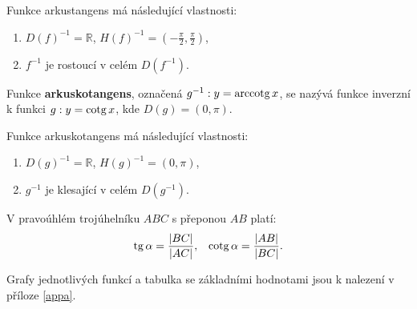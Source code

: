 \begin{pozn}
Funkce arkustangens má následující vlastnosti:
\begin{enumerate}
\item $D(f)^{-1} = \mathbb{R}$, $H(f)^{-1} = \left ( -\frac{\pi}{2}, \frac{\pi}{2} \right )$,
\item $f^{-1}$ je rostoucí v celém $D(f^{-1})$.
\end{enumerate}
\end{pozn}

\begin{definition}
  Funkce \textbf{arkuskotangens}, označená $g^{-1}: y=\operatorname{arccotg} x$, se nazývá funkce inverzní k funkci $g: y=\operatorname{cotg} x$, kde $D(g)=\left ( 0, \pi \right )$.
\end{definition}

\begin{pozn}
Funkce arkuskotangens má následující vlastnosti:
\begin{enumerate}
\item $D(g)^{-1} = \mathbb{R}$, $H(g)^{-1} = \left ( 0, \pi \right )$,
\item $g^{-1}$ je klesající v celém $D(g^{-1})$.
\end{enumerate}
\end{pozn}

\begin{veta}
    V pravoúhlém trojúhelníku $ABC$ s přeponou $AB$ platí:
    \begin{align*}
        \operatorname{tg} \alpha = \frac{ |BC| }{ |AC| }, & & \operatorname{cotg} \alpha = \frac{|AB|}{|BC|}.
    \end{align*}
\end{veta}

\begin{pozn}
    Grafy jednotlivých funkcí a tabulka se základními hodnotami jsou k nalezení
    v příloze \ref{appa}.
\end{pozn}
